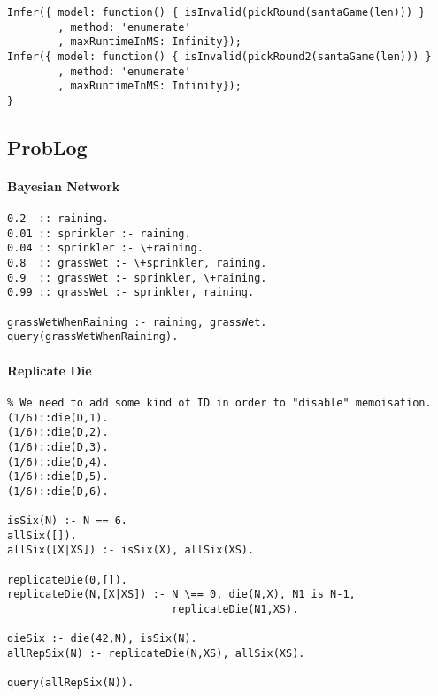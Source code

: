 \begin{verbatim}
Infer({ model: function() { isInvalid(pickRound(santaGame(len))) }
        , method: 'enumerate'
        , maxRuntimeInMS: Infinity});
Infer({ model: function() { isInvalid(pickRound2(santaGame(len))) }
        , method: 'enumerate'
        , maxRuntimeInMS: Infinity});
}
\end{verbatim}
\subsection{ProbLog}

\paragraph{Bayesian Network}

\begin{verbatim}
0.2  :: raining.
0.01 :: sprinkler :- raining.
0.04 :: sprinkler :- \+raining.
0.8  :: grassWet :- \+sprinkler, raining.
0.9  :: grassWet :- sprinkler, \+raining.
0.99 :: grassWet :- sprinkler, raining.

grassWetWhenRaining :- raining, grassWet.
query(grassWetWhenRaining).
\end{verbatim}

\paragraph{Replicate Die}
\begin{verbatim}
% We need to add some kind of ID in order to "disable" memoisation.
(1/6)::die(D,1).
(1/6)::die(D,2).
(1/6)::die(D,3).
(1/6)::die(D,4).
(1/6)::die(D,5).
(1/6)::die(D,6).

isSix(N) :- N == 6.
allSix([]).
allSix([X|XS]) :- isSix(X), allSix(XS).

replicateDie(0,[]).
replicateDie(N,[X|XS]) :- N \== 0, die(N,X), N1 is N-1,
                          replicateDie(N1,XS).

dieSix :- die(42,N), isSix(N).
allRepSix(N) :- replicateDie(N,XS), allSix(XS).

query(allRepSix(N)).
\end{verbatim}

